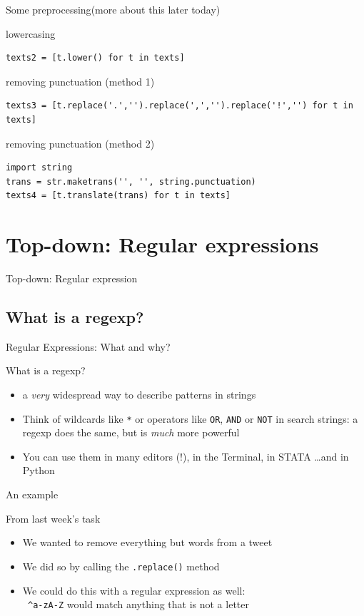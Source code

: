 \documentclass{beamer}
\begin{document}
\begin{frame}[fragile]{Some preprocessing}{(more about this later today)}


lowercasing
\begin{lstlisting}
texts2 = [t.lower() for t in texts]
\end{lstlisting}

removing punctuation (method 1)
\begin{lstlisting}
texts3 = [t.replace('.','').replace(',','').replace('!','') for t in texts]   
\end{lstlisting}

removing punctuation (method 2)
\begin{lstlisting}
import string
trans = str.maketrans('', '', string.punctuation)
texts4 = [t.translate(trans) for t in texts]   
\end{lstlisting}
\end{frame}

\section{Top-down: Regular expressions}
\begin{frame}[plain]
Top-down: Regular expression
\end{frame}



\subsection{What is a regexp?}
\begin{frame}{Regular Expressions: What and why?}
\begin{block}{What is a regexp?}
	\begin{itemize}
		\item<1-> a \emph{very} widespread way to describe patterns in strings
		\item<2-> Think of wildcards like {\tt{*}} or operators like {\tt{OR}}, {\tt{AND}} or {\tt{NOT}} in search strings: a regexp does the same, but is \emph{much} more powerful
		\item<3-> You can use them in many editors (!), in the Terminal, in STATA \ldots and in Python
	\end{itemize}
\end{block}
\end{frame}

\begin{frame}{An example}
\begin{block}{From last week's task}
\begin{itemize}
	\item We wanted to remove everything but words from a tweet
	\item We did so by calling the \texttt{.replace()} method
	\item We could do this with a regular expression as well: \\
	{\tt{ \lbrack \^{}a-zA-Z\rbrack}} would match anything that is not a letter
\end{itemize}
\end{block}
\end{frame}
\end{document}
